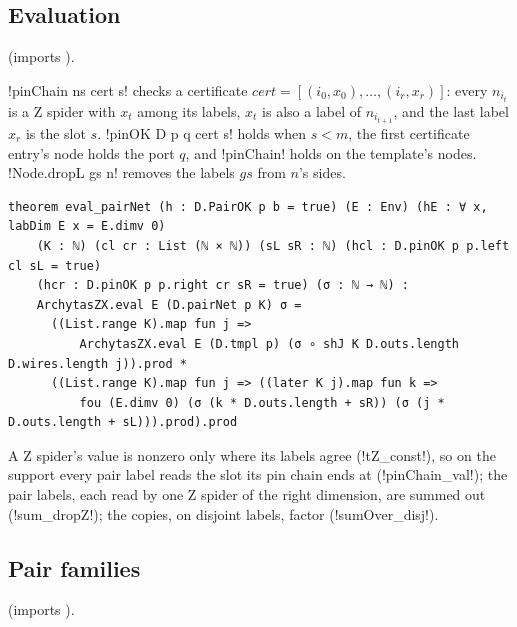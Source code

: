 {\subsection{Evaluation}

 (imports ).

\begin{definition}[Pins]\label{def:boxes-pinOK}
\lbx!pinChain ns cert s! checks a certificate $\mathit{cert}=[(i_0,x_0),\ldots,(i_r,x_r)]$: every $n_{i_t}$ is a Z spider with $x_t$ among its labels, $x_t$ is also a label of $n_{i_{t+1}}$, and the last label $x_r$ is the slot $s$. \lbx!pinOK D p q cert s! holds when $s<m$, the first certificate entry's node holds the port $q$, and \lbx!pinChain! holds on the template's nodes. \lbx!Node.dropL gs n! removes the labels $\mathit{gs}$ from $n$'s sides.
\end{definition}

\begin{theorem}\label{thm:boxes-eval-pairNet}
\begin{lstlisting}[style=leanbox]
theorem eval_pairNet (h : D.PairOK p b = true) (E : Env) (hE : ∀ x, labDim E x = E.dimv 0)
    (K : ℕ) (cl cr : List (ℕ × ℕ)) (sL sR : ℕ) (hcl : D.pinOK p p.left cl sL = true)
    (hcr : D.pinOK p p.right cr sR = true) (σ : ℕ → ℕ) :
    ArchytasZX.eval E (D.pairNet p K) σ =
      ((List.range K).map fun j =>
          ArchytasZX.eval E (D.tmpl p) (σ ∘ shJ K D.outs.length D.wires.length j)).prod *
      ((List.range K).map fun j => ((later K j).map fun k =>
          fou (E.dimv 0) (σ (k * D.outs.length + sR)) (σ (j * D.outs.length + sL))).prod).prod
\end{lstlisting}
\end{theorem}
\noindent A Z spider's value is nonzero only where its labels agree (\lbx!tZ_const!), so on the support every pair label reads the slot its pin chain ends at (\lbx!pinChain_val!); the pair labels, each read by one Z spider of the right dimension, are summed out (\lbx!sum_dropZ!); the copies, on disjoint labels, factor (\lbx!sumOver_disj!).

\subsection{Pair families}

 (imports ).

}
